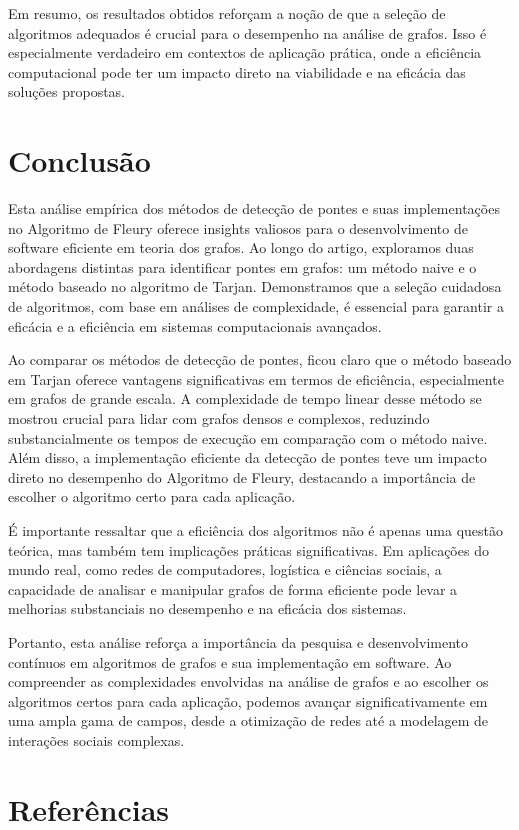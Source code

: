 \documentclass[12pt]{article}
\begin{document}
Em resumo, os resultados obtidos reforçam a noção de que a seleção de algoritmos adequados é crucial para o desempenho na análise de grafos. Isso é especialmente verdadeiro em contextos de aplicação prática, onde a eficiência computacional pode ter um impacto direto na viabilidade e na eficácia das soluções propostas.



\section{Conclusão}

Esta análise empírica dos métodos de detecção de pontes e suas implementações no Algoritmo de Fleury oferece insights valiosos para o desenvolvimento de software eficiente em teoria dos grafos. Ao longo do artigo, exploramos duas abordagens distintas para identificar pontes em grafos: um método naive e o método baseado no algoritmo de Tarjan. Demonstramos que a seleção cuidadosa de algoritmos, com base em análises de complexidade, é essencial para garantir a eficácia e a eficiência em sistemas computacionais avançados.

Ao comparar os métodos de detecção de pontes, ficou claro que o método baseado em Tarjan oferece vantagens significativas em termos de eficiência, especialmente em grafos de grande escala. A complexidade de tempo linear desse método se mostrou crucial para lidar com grafos densos e complexos, reduzindo substancialmente os tempos de execução em comparação com o método naive. Além disso, a implementação eficiente da detecção de pontes teve um impacto direto no desempenho do Algoritmo de Fleury, destacando a importância de escolher o algoritmo certo para cada aplicação.

É importante ressaltar que a eficiência dos algoritmos não é apenas uma questão teórica, mas também tem implicações práticas significativas. Em aplicações do mundo real, como redes de computadores, logística e ciências sociais, a capacidade de analisar e manipular grafos de forma eficiente pode levar a melhorias substanciais no desempenho e na eficácia dos sistemas.

Portanto, esta análise reforça a importância da pesquisa e desenvolvimento contínuos em algoritmos de grafos e sua implementação em software. Ao compreender as complexidades envolvidas na análise de grafos e ao escolher os algoritmos certos para cada aplicação, podemos avançar significativamente em uma ampla gama de campos, desde a otimização de redes até a modelagem de interações sociais complexas.

\section{Referências}
\printbibliography
\end{document}
